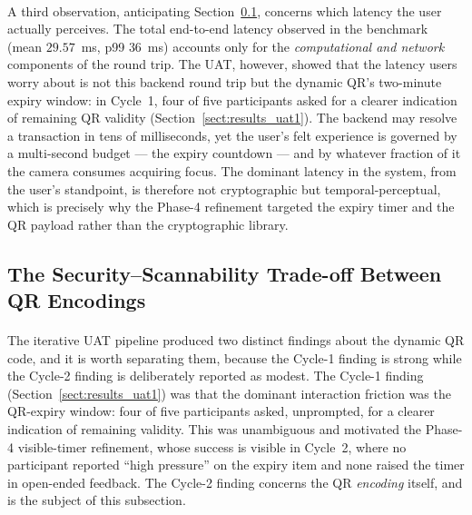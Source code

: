 \paragraph{}A third observation, anticipating Section~\ref{sect:disc_qr}, concerns which latency the user actually perceives. The total end-to-end latency observed in the benchmark (mean $29.57$~ms, p99 $36$~ms) accounts only for the \textit{computational and network} components of the round trip. The UAT, however, showed that the latency users worry about is not this backend round trip but the dynamic QR's two-minute expiry window: in Cycle~1, four of five participants asked for a clearer indication of remaining QR validity (Section~\ref{sect:results_uat1}). The backend may resolve a transaction in tens of milliseconds, yet the user's felt experience is governed by a multi-second budget --- the expiry countdown --- and by whatever fraction of it the camera consumes acquiring focus. The dominant latency in the system, from the user's standpoint, is therefore not cryptographic but temporal-perceptual, which is precisely why the Phase-4 refinement targeted the expiry timer and the QR payload rather than the cryptographic library.

\subsection{The Security--Scannability Trade-off Between QR Encodings}
\label{sect:disc_qr}

\paragraph{}The iterative UAT pipeline produced two distinct findings about the dynamic QR code, and it is worth separating them, because the Cycle-1 finding is strong while the Cycle-2 finding is deliberately reported as modest. The Cycle-1 finding (Section~\ref{sect:results_uat1}) was that the dominant interaction friction was the QR-expiry window: four of five participants asked, unprompted, for a clearer indication of remaining validity. This was unambiguous and motivated the Phase-4 visible-timer refinement, whose success is visible in Cycle~2, where no participant reported ``high pressure'' on the expiry item and none raised the timer in open-ended feedback. The Cycle-2 finding concerns the QR \textit{encoding} itself, and is the subject of this subsection.

